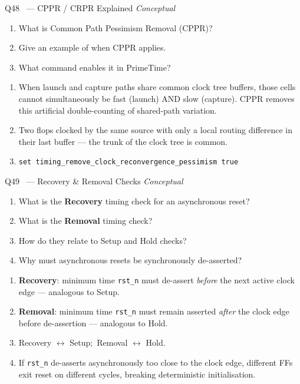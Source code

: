 \documentclass[12pt,a4paper]{article}
\newcommand{\advanced}{%
  \fbox{\textcolor{advred}{\bfseries\sffamily\small ADVANCED}}}
\newcommand{\moderate}{%
  \fbox{\textcolor{modoran}{\bfseries\sffamily\small MODERATE}}}
\begin{document}
\begin{questionbox}{Q48 \moderate\ --- CPPR / CRPR Explained \hfill\textit{Conceptual}}
\begin{enumerate}[label=\textbf{\alph*)}]
  \item What is Common Path Pessimism Removal (CPPR)?
  \item Give an example of when CPPR applies.
  \item What command enables it in PrimeTime?
\end{enumerate}
\end{questionbox}

\begin{answerbox}
\begin{enumerate}[label=\textbf{\alph*)}]
  \item When launch and capture paths share common clock tree buffers, those cells cannot simultaneously be fast (launch) AND slow (capture). CPPR removes this artificial double-counting of shared-path variation.
  \item Two flops clocked by the same source with only a local routing difference in their last buffer --- the trunk of the clock tree is common.
  \item \texttt{set timing\_remove\_clock\_reconvergence\_pessimism true}
\end{enumerate}
\end{answerbox}

\begin{questionbox}{Q49 \advanced\ --- Recovery \& Removal Checks \hfill\textit{Conceptual}}
\begin{enumerate}[label=\textbf{\alph*)}]
  \item What is the \textbf{Recovery} timing check for an asynchronous reset?
  \item What is the \textbf{Removal} timing check?
  \item How do they relate to Setup and Hold checks?
  \item Why must asynchronous resets be synchronously de-asserted?
\end{enumerate}
\end{questionbox}

\begin{answerbox}
\begin{enumerate}[label=\textbf{\alph*)}]
  \item \textbf{Recovery}: minimum time \texttt{rst\_n} must de-assert \emph{before} the next active clock edge --- analogous to Setup.
  \item \textbf{Removal}: minimum time \texttt{rst\_n} must remain asserted \emph{after} the clock edge before de-assertion --- analogous to Hold.
  \item Recovery $\leftrightarrow$ Setup;\ Removal $\leftrightarrow$ Hold.
  \item If \texttt{rst\_n} de-asserts asynchronously too close to the clock edge, different FFs exit reset on different cycles, breaking deterministic initialisation.
\end{enumerate}
\end{answerbox}
\end{document}

